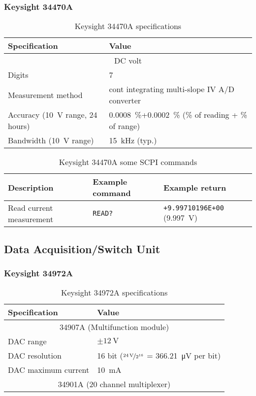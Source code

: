 \subsubsection{Keysight 34470A}\label{app:keysight-34470A}
\begin{table}[H]
	\centering
	\caption{Keysight 34470A specifications}
	\label{tab:keysight-34470A-specs}
	\begin{tabularx}{\textwidth}{ll}
		\toprule
		\textbf{Specification} & \textbf{Value}\\
		\midrule
		\multicolumn{2}{c}{DC volt}\\
		Digits & 7~\nicefrac{1}{2}\\
		Measurement method & cont integrating multi-slope IV A/D converter\\
		Accuracy (\SI{10}{\volt} range, 24 hours) & \SI{0.0008}{\percent}+\SI{0.0002}{\percent} (\si{\percent} of reading + \si{\percent} of range)\\
		Bandwidth (\SI{10}{\volt} range) & \SI{15}{\kHz} (typ.)\\
		\bottomrule
	\end{tabularx}
\end{table}

\begin{table}[H]
	\centering
	\caption{Keysight 34470A some SCPI commands}
	\label{tab:keysight-34470A-scpi}
	\begin{tabularx}{\textwidth}{Xll}
		\toprule
		\textbf{Description} & \textbf{Example command} & \textbf{Example return}\\
		\midrule
		Read current measurement & \texttt{READ?} & \texttt{+9.99710196E+00} (\SI{9.997}{\volt})\\
		\bottomrule
	\end{tabularx}
\end{table}

\subsection{Data Acquisition/Switch Unit}
\subsubsection{Keysight 34972A}\label{app:keysight-34972A}
\begin{table}[H]
	\centering
	\caption{Keysight 34972A specifications}
	\label{tab:keysight-34972A-specs}
	\begin{tabularx}{\textwidth}{ll}
		\toprule
		\textbf{Specification} & \textbf{Value}\\
		\midrule
		\multicolumn{2}{c}{34907A (Multifunction module)}\\
		DAC range & $\pm \SI{12}{\volt}$ \\
		DAC resolution & 16 bit ($\nicefrac{\SI{24}{\volt}}{2^{16}}$ = \SI{366.21}{\micro\volt} per bit) \\
		DAC maximum current & \SI{10}{\mA} \\
		\multicolumn{2}{c}{34901A (20 channel multiplexer)}\\
		\bottomrule
	\end{tabularx}
\end{table}

